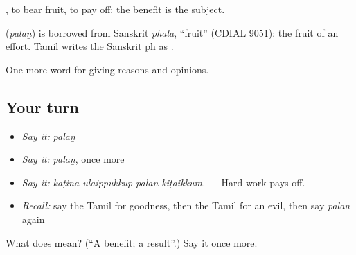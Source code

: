  , to bear fruit, to pay off: the benefit is the subject.

\begin{cousinweb}
\textbf{} (\emph{palaṉ}) is borrowed from Sanskrit \emph{phala}, \textquotedblleft{}fruit\textquotedblright{} (CDIAL 9051): the fruit of an effort. Tamil writes the Sanskrit ph as .
\end{cousinweb}

\begin{grammarlens}[title={What you've built}]
One more word for giving reasons and opinions.
\end{grammarlens}

\subsection*{Your turn}
\begin{itemize}
\raggedright
  \item \emph{Say it:} \emph{palaṉ}
  \item \emph{Say it:} \emph{palaṉ}, once more
  \item \emph{Say it:} \emph{kaṭiṉa uḻaippukkup palaṉ kiṭaikkum.} — Hard work pays off.
  \item \emph{Recall:} say the Tamil for goodness, then the Tamil for an evil, then say \emph{palaṉ} again
\end{itemize}

\begin{tcolorbox}[breakable,colback=teal!4,colframe=teal!35!black,title={Before you move on}]
What does  mean? (\textquotedblleft{}A benefit; a result\textquotedblright{}.) Say it once more.
\end{tcolorbox}
